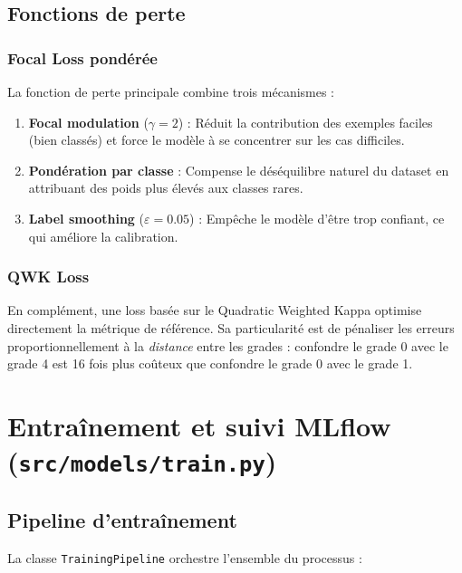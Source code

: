 \documentclass[11pt,a4paper]{article}
\begin{document}
\subsection{Fonctions de perte}

\subsubsection{Focal Loss pondérée}

La fonction de perte principale combine trois mécanismes :

\begin{enumerate}[leftmargin=2em]
  \item \textbf{Focal modulation} ($\gamma = 2$) : Réduit la contribution des exemples faciles (bien classés) et force le modèle à se concentrer sur les cas difficiles.
  \item \textbf{Pondération par classe} : Compense le déséquilibre naturel du dataset en attribuant des poids plus élevés aux classes rares.
  \item \textbf{Label smoothing} ($\varepsilon = 0.05$) : Empêche le modèle d'être trop confiant, ce qui améliore la calibration.
\end{enumerate}

\subsubsection{QWK Loss}

En complément, une loss basée sur le Quadratic Weighted Kappa optimise directement la métrique de référence. Sa particularité est de pénaliser les erreurs proportionnellement à la \emph{distance} entre les grades : confondre le grade 0 avec le grade 4 est 16 fois plus coûteux que confondre le grade 0 avec le grade 1.

\section{Entraînement et suivi MLflow (\texttt{src/models/train.py})}

\subsection{Pipeline d'entraînement}

La classe \texttt{TrainingPipeline} orchestre l'ensemble du processus :
\end{document}
